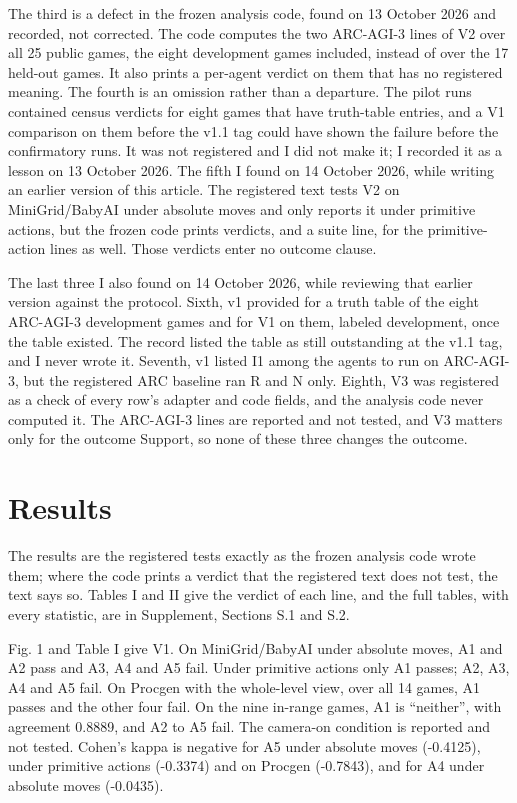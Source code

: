 \documentclass[journal]{IEEEtran}
\begin{document}
The third is a defect in the frozen analysis code, found on 13 October
2026 and recorded, not corrected. The code computes the two ARC-AGI-3
lines of V2 over all 25 public games, the eight development games
included, instead of over the 17 held-out games. It also prints a
per-agent verdict on them that has no registered meaning. The fourth is
an omission rather than a departure. The pilot runs contained census
verdicts for eight games that have truth-table entries, and a V1
comparison on them before the v1.1 tag could have shown the failure
before the confirmatory runs. It was not registered and I did not make
it; I recorded it as a lesson on 13 October 2026. The fifth I found on
14 October 2026, while writing an earlier version of this article. The
registered text tests V2 on MiniGrid/BabyAI under absolute moves and
only reports it under primitive actions, but the frozen code prints
verdicts, and a suite line, for the primitive-action lines as well.
Those verdicts enter no outcome clause.

The last three I also found on 14 October 2026, while reviewing that
earlier version against the protocol. Sixth, v1 provided for a truth
table of the eight ARC-AGI-3 development games and for V1 on them,
labeled development, once the table existed. The record listed the table
as still outstanding at the v1.1 tag, and I never wrote it. Seventh, v1
listed I1 among the agents to run on ARC-AGI-3, but the registered ARC
baseline ran R and N only. Eighth, V3 was registered as a check of every
row's adapter and code fields, and the analysis code never computed it.
The ARC-AGI-3 lines are reported and not tested, and V3 matters only for
the outcome Support, so none of these three changes the outcome.

\section{Results}\label{results}

The results are the registered tests exactly as the frozen analysis code
wrote them; where the code prints a verdict that the registered text
does not test, the text says so. Tables I and II give the verdict of
each line, and the full tables, with every statistic, are in Supplement,
Sections S.1 and S.2.

Fig. 1 and Table I give V1. On MiniGrid/BabyAI under absolute moves, A1
and A2 pass and A3, A4 and A5 fail. Under primitive actions only A1
passes; A2, A3, A4 and A5 fail. On Procgen with the whole-level view,
over all 14 games, A1 passes and the other four fail. On the nine
in-range games, A1 is ``neither'', with agreement 0.8889, and A2 to A5
fail. The camera-on condition is reported and not tested. Cohen's kappa
is negative for A5 under absolute moves (-0.4125), under primitive
actions (-0.3374) and on Procgen (-0.7843), and for A4 under absolute
moves (-0.0435).
\end{document}
